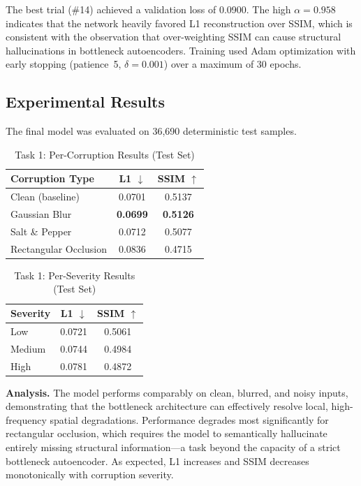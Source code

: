 \documentclass[conference]{IEEEtran}
\begin{document}
The best trial (\#14) achieved a validation loss of 0.0900. The high $\alpha = 0.958$ indicates that the network heavily favored L1 reconstruction over SSIM, which is consistent with the observation that over-weighting SSIM can cause structural hallucinations in bottleneck autoencoders. Training used Adam optimization with early stopping (patience~5, $\delta = 0.001$) over a maximum of 30 epochs.

\subsection{Experimental Results}

The final model was evaluated on 36,690 deterministic test samples.

\begin{table}[H]
\centering
\caption{Task 1: Per-Corruption Results (Test Set)}
\label{tab:task1_corruption}
\begin{tabular}{lcc}
\toprule
\textbf{Corruption Type} & \textbf{L1 $\downarrow$} & \textbf{SSIM $\uparrow$} \\
\midrule
Clean (baseline) & 0.0701 & 0.5137 \\
Gaussian Blur & \textbf{0.0699} & \textbf{0.5126} \\
Salt \& Pepper & 0.0712 & 0.5077 \\
Rectangular Occlusion & 0.0836 & 0.4715 \\
\bottomrule
\end{tabular}
\end{table}

\begin{table}[H]
\centering
\caption{Task 1: Per-Severity Results (Test Set)}
\label{tab:task1_severity}
\begin{tabular}{lcc}
\toprule
\textbf{Severity} & \textbf{L1 $\downarrow$} & \textbf{SSIM $\uparrow$} \\
\midrule
Low & 0.0721 & 0.5061 \\
Medium & 0.0744 & 0.4984 \\
High & 0.0781 & 0.4872 \\
\bottomrule
\end{tabular}
\end{table}

\textbf{Analysis.} The model performs comparably on clean, blurred, and noisy inputs, demonstrating that the bottleneck architecture can effectively resolve local, high-frequency spatial degradations. Performance degrades most significantly for rectangular occlusion, which requires the model to semantically hallucinate entirely missing structural information---a task beyond the capacity of a strict bottleneck autoencoder. As expected, L1 increases and SSIM decreases monotonically with corruption severity.
\end{document}

